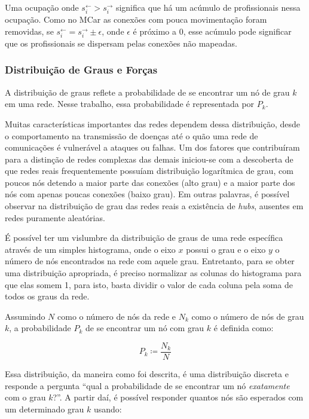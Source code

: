 \documentclass[12pt,a4paper]{article}
\theoremstyle{hypo}
\newcommand{\defn}{\coloneqq} %
\newcommand{\linkin}[1]{#1^\leftarrow} %
\newcommand{\linkout}[1]{#1^\rightarrow} %
\begin{document}
Uma ocupação onde $\linkin{s}_i > \linkout{s}_i$ significa que há um acúmulo de profissionais nessa ocupação. Como no MCar as conexões com pouca movimentação foram removidas, se $\linkin{s}_i = \linkout{s}_i \pm \epsilon$, onde $\epsilon$ é próximo a 0, esse acúmulo pode significar que os profissionais se dispersam pelas conexões não mapeadas. 

\subsubsection{Distribuição de Graus e Forças} \label{sec:distribuicao-grau-forca}

A distribuição de graus reflete a probabilidade de se encontrar um nó de grau $k$ em uma rede. Nesse trabalho, essa probabilidade é representada por $P_k$.

Muitas características importantes das redes dependem dessa distribuição, desde o comportamento na transmissão de doenças até o quão uma rede de comunicações é vulnerável a ataques ou falhas. Um dos fatores que contribuíram para a distinção de redes complexas das demais iniciou-se com a descoberta de \cite{Barabasi1999-sn} que redes reais frequentemente possuíam distribuição logarítmica de grau, com poucos nós detendo a maior parte das conexões (alto grau) e a maior parte dos nós com apenas poucas conexões (baixo grau). Em outras palavras, é possível observar na distribuição de grau das redes reais a existência de \textit{hubs}, ausentes em redes puramente aleatórias.

É possível ter um vislumbre da distribuição de graus de uma rede específica através de um simples histograma, onde o eixo $x$ possui o grau e o eixo $y$ o número de nós encontrados na rede com aquele grau. Entretanto, para se obter uma distribuição apropriada, é preciso normalizar as colunas do histograma para que elas somem 1, para isto, basta dividir o valor de cada coluna pela soma de todos os graus da rede.

Assumindo $N$ como o número de nós da rede e $N_k$ como o número de nós de grau $k$, a probabilidade $P_k$ de se encontrar um nó com grau $k$ é definida como:

\begin{equation} \label{eq:probabilidade-grau}
P_k \defn \frac{N_k}{N}
\end{equation}

Essa distribuição, da maneira como foi descrita, é uma distribuição discreta e responde a pergunta \enquote{qual a probabilidade de se encontrar um nó \textit{exatamente}~ com o grau $k$?}. A partir daí, é possível responder quantos nós são esperados com um determinado grau $k$ usando:
\end{document}
